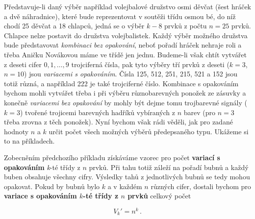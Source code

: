       Představuje-li daný výběr například volejbalové družstvo osmi děvčat (šest hráček a dvě 
      náhradnice), které bude reprezentovat v soutěži třídu osmou bé, do níž chodí \num{25} děvčat 
      a \num{18} chlapců, jedná se o výběr \(k - 8\) prvků z počtu \(n = 25\) prvků. Chlapce nelze 
      postavit do družstva volejbalistek. Každý výběr možného družstva bude představovat 
      \emph{kombinaci bez opakování}, neboť pořadí hráček nehraje roli a třeba Aničku Novákovou 
      máme ve třídě jen jednu. Budeme-li však chtít vytvářet z deseti cifer \(0, 1, \ldots, 9\) 
      trojciferná čísla, pak tyto výběry tří prvků z deseti (\(k = 3\), \(n = 10\)) jsou 
      \emph{variacemi s opakováním}. Čísla \num{125}, \num{512}, \num{251}, \num{215}, \num{521} a 
      \num{152} jsou totiž různá, a například \num{222} je také trojciferné číslo. Kombinace s 
      opakováním bychom mohli vytvářet třeba i při výběru různobarevných ponožek ze zásuvky a 
      konečně \emph{variacemi bez opakování} by mohly být dejme tomu trojbarevné signály (\(k = 
      3\)) tvořené trojicemi barevných hadříků vybíraných z \(n\) barev (pro \(n = 3\) třeba zrovna 
      z těch ponožek). Nyní bychom však rádi věděli, jak pro zadané hodnoty \(n\) a \(k\) určit 
      počet všech možných výběrů předepsaného typu. Ukážeme si to na příkladech.

      
      
      Zobecněním předchozího příkladu získáváme vzorec pro počet \textbf{variací s opakováním} 
      \emph{k}-té třídy z \(n\) prvků. Při tahu totiž záleží na pořadí bubnů a každý buben obsahuje 
      všechny cifry. Výsledky tahů z jednotlivých bubnů se tedy mohou opakovat. Pokud by bubnů bylo 
      \(k\) a v každém \(n\) různých cifer, dostali bychom pro \textbf{variace s opakováním 
      \(k\)-té třídy z \(n\) prvků} celkový počet
      \begin{mdframed}[style=highlight]
        \begin{equation}\label{mai:eq007}
          \boxed{V_k' = n^k}\, .
        \end{equation}
      \end{mdframed}

      
      

